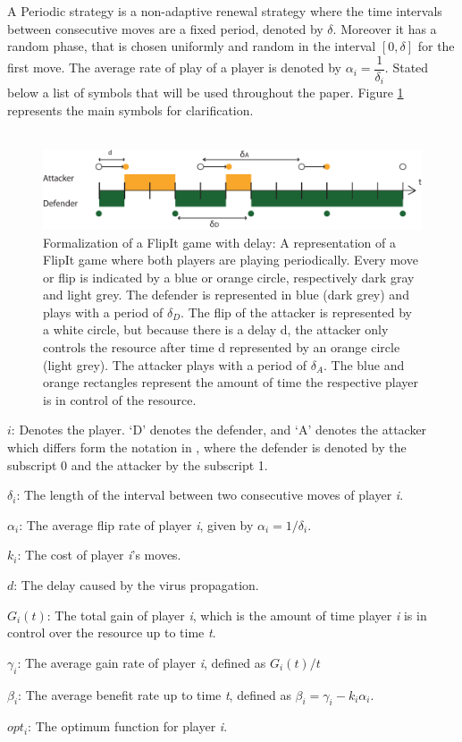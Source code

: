  A Periodic strategy is a non-adaptive renewal strategy where the time intervals between consecutive moves are a fixed period, denoted by $\delta$. Moreover it has a random phase, that is chosen uniformly and random in the interval $[0,\delta]$ for the first move. The average rate of play of a player is denoted by $\alpha_{i} = \dfrac{1}{\delta_{i}}$. Stated below a list of symbols that will be used throughout the paper. Figure \ref{FlipItDelay} represents the main symbols for clarification.\\
~~\\

\begin{figure}[hbtp]
\centering
\includegraphics[scale=0.7]{Images/DefFlip.pdf}
\caption{Formalization of a FlipIt game with delay: A representation of a FlipIt game where both players are playing periodically. Every move or flip is indicated by a blue or orange circle, respectively dark gray and light grey.  The defender is represented in blue (dark grey) and plays with a period of $\delta_{D}$. The flip of the attacker is represented by a white circle, but because there is a delay d, the attacker only controls the resource after time d represented by an orange circle (light grey). The attacker plays with a period of $\delta_{A}$. The blue and orange rectangles represent the amount of time the respective player is in control of the resource.}
\label{FlipItDelay}
\end{figure}

\begin{description}
\item $i$: Denotes the player. `D' denotes the defender, and `A' denotes the attacker which differs form the notation in \citep{FlipIt}, where the defender is denoted by the subscript 0 and the attacker by the subscript 1.
\item $\delta_{i}$: The length of the interval between two consecutive moves of player \textit{i}. 
\item $\alpha_{i}$: The average flip rate of player \textit{i}, given by $\alpha_{i}=1/\delta_{i}$.
\item $k_{i}$: The cost of player \textit{i}'s moves.
\item $d$: The delay caused by the virus propagation.
\item $G_{i}(t)$: The total gain of player \textit{i}, which is the amount of time player \textit{i} is in control over the resource up to time \textit{t}.
\item $\gamma_{i}$: The average gain rate of player \textit{i}, defined as $G_{i}(t)/t$
\item $\beta_{i}$:  The average benefit rate up to time \textit{t}, defined as  $\beta_{i} = \gamma_{i} -k_{i} \alpha_{i} $.
\item $opt_{i}$: The optimum function for player \textit{i}. 
\end{description}

